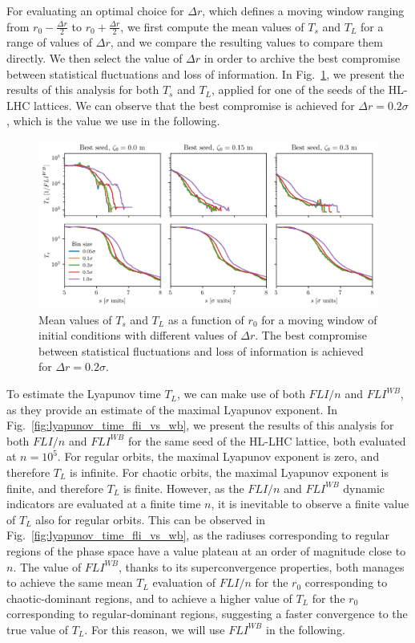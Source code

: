 For evaluating an optimal choice for $\Delta r$, which defines a moving window ranging from $r_0 - \frac{\Delta r}{2}$ to $r_0 + \frac{\Delta r}{2}$, we first compute the mean values of $T_s$ and $T_L$ for a range of values of $\Delta r$, and we compare the resulting values to compare them directly. We then select the value of $\Delta r$ in order to archive the best compromise between statistical fluctuations and loss of information. In Fig.~\ref{fig:ts_vs_r0}, we present the results of this analysis for both $T_s$ and $T_L$, applied for one of the seeds of the HL-LHC lattices. We can observe that the best compromise is achieved for $\Delta r = 0.2\sigma$, which is the value we use in the following.

\begin{figure}
    \centering
    \includegraphics[width=1\textwidth]{6_lhc_dynamic_indicators/figs/lyapunov_time_vs_thickness.png}
    \caption{Mean values of $T_s$ and $T_L$ as a function of $r_0$ for a moving window of initial conditions with different values of $\Delta r$. The best compromise between statistical fluctuations and loss of information is achieved for $\Delta r = 0.2\sigma$.}
    \label{fig:ts_vs_r0}
\end{figure}

To estimate the Lyapunov time $T_L$, we can make use of both $FLI/n$ and $FLI^{{WB}}$, as they provide an estimate of the maximal Lyapunov exponent. In Fig.~\ref{fig:lyapunov_time_fli_vs_wb}, we present the results of this analysis for both $FLI/n$ and $FLI^{{WB}}$ for the same seed of the HL-LHC lattice, both evaluated at $n=10^5$. For regular orbits, the maximal Lyapunov exponent is zero, and therefore $T_L$ is infinite. For chaotic orbits, the maximal Lyapunov exponent is finite, and therefore $T_L$ is finite. However, as the $FLI/n$ and $FLI^{WB}$ dynamic indicators are evaluated at a finite time $n$, it is inevitable to observe a finite value of $T_L$ also for regular orbits. This can be observed in Fig.~\ref{fig:lyapunov_time_fli_vs_wb}, as the radiuses corresponding to regular regions of the phase space have a value plateau at an order of magnitude close to $n$. The value of $FLI^{{WB}}$, thanks to its superconvergence properties, both manages to achieve the same mean $T_L$ evaluation of $FLI/n$ for the $r_0$ corresponding to chaotic-dominant regions, and to achieve a higher value of $T_L$ for the $r_0$ corresponding to regular-dominant regions, suggesting a faster convergence to the true value of $T_L$. For this reason, we will use $FLI^{{WB}}$ in the following.

